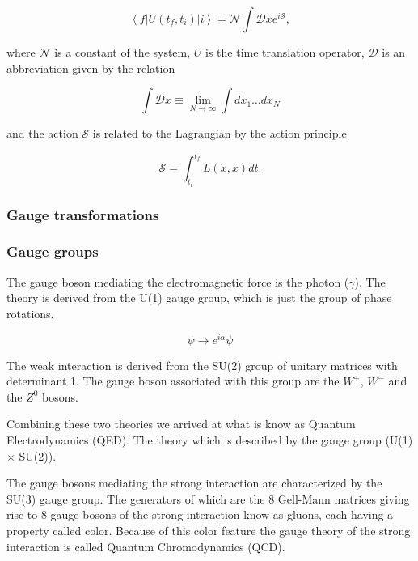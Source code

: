\begin{equation}
	\left \langle f \right | U(t_f,t_i) \left | i \right \rangle = \mathcal{N} \int \mathcal{D}x e^{i\mathcal{S}},
\end{equation}

where $\mathcal{N}$ is a constant of the system, $U$ is the time translation operator, $\mathcal{D}$ is an abbreviation given by the relation 

\begin{equation}
	\int \mathcal{D} x \equiv \lim_{N \to \infty} \int dx_1 \dots dx_N
\end{equation}

and the action $\mathcal{S}$ is related to the Lagrangian by the action principle

\begin{equation}
	\mathcal{S} = \int_{t_i}^{t_f} L(\dot{x},x)dt.
\end{equation}

\subsubsection{Gauge transformations}

\subsubsection{Gauge groups}
The gauge boson mediating the electromagnetic force is the photon ($\gamma$). The theory is derived from the U(1) gauge group, which is just the group of phase rotations.

\begin{equation}
    \psi \rightarrow e^{i\alpha} \psi
\end{equation}

The weak interaction is derived from the SU(2) group of unitary matrices with determinant 1. The gauge boson associated with this group are the $W^+$, $W^-$ and the $Z^0$ bosons.

Combining these two theories we arrived at what is know as Quantum Electrodynamics (QED). The theory which is described by the gauge group (U(1) $\times$ SU(2)).

The gauge bosons mediating the strong interaction are characterized by the SU(3) gauge group. The generators of which are the 8 Gell-Mann matrices giving rise to 8 gauge bosons of the strong interaction know as gluons, each having a property called color. Because of this color feature the gauge theory of the strong interaction is called Quantum Chromodynamics (QCD).

